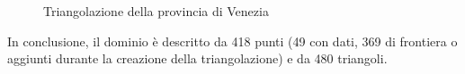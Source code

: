 \documentclass[a4paper,11pt,twoside,openright]{book}							%
\begin{document}
\begin{figure}[h]
\centering
{}
\caption{Triangolazione della provincia di Venezia}
\label{fig:Ven_triang}
\end{figure}
\newpage
In conclusione, il dominio è descritto da 418 punti (49 con dati, 369 di frontiera o aggiunti durante la creazione della triangolazione) e da 480 triangoli.
\end{document}
